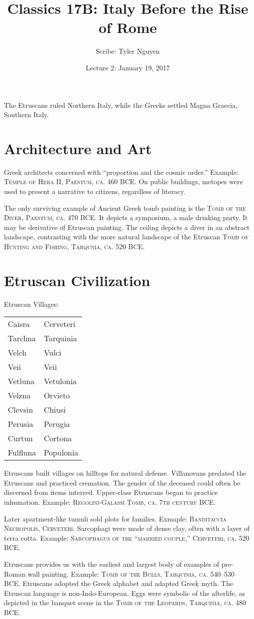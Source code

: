 \documentclass{article}
\begin{document}
\title{Classics 17B: Italy Before the Rise of Rome}
\author{Scribe: Tyler Nguyen}
\date{Lecture 2: January 19, 2017}
\maketitle
The Etruscans ruled Northern Italy, while the Greeks settled Magna Graecia, Southern Italy.
\section{Architecture and Art}
Greek architects concerned with ``proportion and the cosmic order.'' Example: \textsc{Temple of Hera II, Paestum, ca. 460 BCE}.  On public buildings, metopes were used to present a narrative to citizens, regardless of literacy.

The only surviving example of Ancient Greek tomb painting is the \textsc{Tomb of the Diver, Paestum, ca. 470 BCE}.  It depicts a symposium, a male drinking party. It may be derivative of Etruscan painting.  The ceiling depicts a diver in an abstract landscape, contrasting with the more natural landscape of the Etruscan \textsc{Tomb of Hunting and Fishing, Tarqunia, ca. 520 BCE}.
\section{Etruscan Civilization}
Etruscan Villages:\\
\begin{tabular}{ll}
Caisra & Cerveteri\\
Tarchna & Tarquinia\\
Velch & Vulci\\
Veii & Veii\\
Vetluna & Vetulonia\\
Velzna & Orvieto\\
Clevsin & Chiusi\\
Perusia & Perugia\\
Curtun & Cortona\\
Fulfluna & Populonia\\
\end{tabular}

Etruscans built villages on hilltops for natural defense. Villanovans predated the Etruscans and practiced cremation. The gender of the deceased could often be discerned from items interred. Upper-class Etruscans began to practice inhumation. Example: \textsc{Regolini-Galassi Tomb, ca. 7th century BCE}.

Later apartment-like tumuli sold plots for families. Exmaple: \textsc{Banditaccia Necropolis, Cerveteri}. Sarcophagi were made of dense clay, often with a layer of terra cotta. Example: \textsc{Sarcophagus of the ``married couple,'' Cerveteri, ca. 520 BCE}.

Etruscans provides us with the earliest and largest body of examples of pre-Roman wall painting. Example: \textsc{Tomb of the Bulls, Tarquinia, ca. 540--530 BCE}. Etruscans adopted the Greek alphabet and adapted Greek myth.  The Etruscan language is non-Indo-European. Eggs were symbolic of the afterlife, as depicted in the banquet scene in the \textsc{Tomb of the Leopards, Tarquinia, ca. 480 BCE}.
\end{document}
